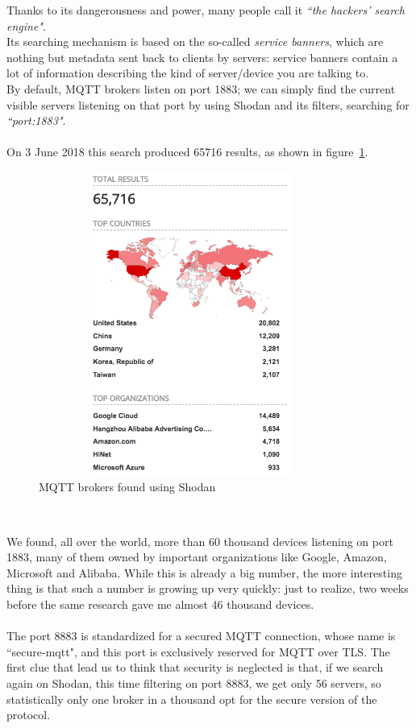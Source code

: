 \documentclass[12pt]{report}
\begin{document}
{{Thanks to its dangerousness and power, many people call it \emph{``the hackers' search engine"}.\\
Its searching mechanism is based on the so-called \emph{service banners}, which are nothing but metadata sent back to clients by servers: service banners contain a lot of information describing the kind of server/device you are talking to.\\

By default, MQTT brokers listen on port 1883; we can simply find the current visible servers listening on that port by using Shodan and its filters, searching for \emph{``port:1883"}.\\\\
On 3 June 2018 this search produced 65716 results, as shown in figure~\ref{fig:shodanres}.\\

\begin{figure}[H]
\includegraphics[width=10cm,height=10cm,keepaspectratio]{shodan_numdevices}
\centering
\caption{MQTT brokers found using Shodan}
\label{fig:shodanres}
\end{figure}\

We found, all over the world, more than 60 thousand devices listening on port 1883, many of them owned by important organizations like Google, Amazon, Microsoft and Alibaba.
While this is already a big number, the more interesting thing is that such a number is growing up very quickly: just to realize, two weeks before the same research gave me almost 46 thousand devices.\\\\
The port 8883 is standardized for a secured MQTT connection, whose name is ``secure-mqtt", and this port is exclusively reserved for MQTT over TLS.
The first clue that lead us to think that security is neglected is that, if we search again on Shodan, this time filtering on port 8883, we get only 56 servers, so statistically only one broker in a thousand opt for the secure version of the protocol.

}}
\end{document}

